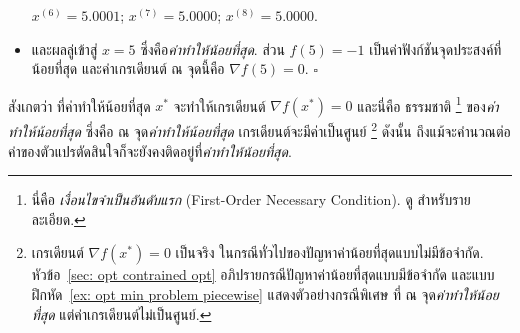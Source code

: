 \begin{itemize}
$x^{(6)} = 5.0001$;
$x^{(7)} = 5.0000$;
$x^{(8)} = 5.0000$.
%		
		\item และผลลู่เข้าสู่ $x = 5$ ซึ่งคือ\textit{ค่าทำให้น้อยที่สุด}.
		ส่วน $f(5) = -1$ เป็นค่าฟังก์ชันจุดประสงค์ที่น้อยที่สุด 
		และค่าเกรเดียนต์ ณ จุดนี้คือ $\nabla f(5) = 0$.
	\hfill $\square$
	\end{itemize}
%	
สังเกตว่า ที่ค่าทำให้น้อยที่สุด $x^\ast$ จะทำให้เกรเดียนต์ $\nabla f(x^\ast) = 0$
และนี่คือ ธรรมชาติ%
\footnote{%
	นี่คือ \textit{เงื่อนไขจำเป็นอันดับแรก} (First-Order Necessary Condition).
	ดู \cite{ChongZak2ndEd} สำหรับรายละเอียด.
}
ของ\textit{ค่าทำให้น้อยที่สุด}
ซึ่งคือ
ณ จุด\textit{ค่าทำให้น้อยที่สุด}
เกรเดียนต์จะมีค่าเป็นศูนย์%
\footnote{%
เกรเดียนต์ $\nabla f(x^\ast) = 0$
เป็นจริง 
ในกรณีทั่วไปของปัญหาค่าน้อยที่สุดแบบไม่มีข้อจำกัด.
หัวข้อ~\ref{sec: opt contrained opt} อภิปรายกรณีปัญหาค่าน้อยที่สุดแบบมีข้อจำกัด
และแบบฝึกหัด~\ref{ex: opt min problem piecewise} แสดงตัวอย่างกรณีพิเศษ
ที่  
ณ จุด\textit{ค่าทำให้น้อยที่สุด}
แต่ค่าเกรเดียนต์ไม่เป็นศูนย์.
}
ดังนั้น ถึงแม้จะคำนวณต่อ
ค่าของตัวแปรตัดสินใจก็จะยังคงติดอยู่ที่\textit{ค่าทำให้น้อยที่สุด}.


